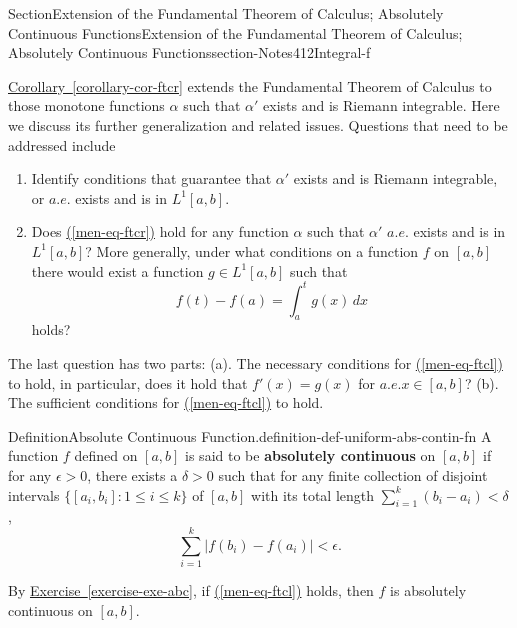 \documentclass[oneside,10pt,]{article}
\newcommand{\xreffont}{\relax}
\newcommand{\terminology}[1]{\textbf{#1}}
\numberwithin{equation}{section}
\begin{document}
\begin{sectionptx}{Section}{Extension of the Fundamental Theorem of Calculus; Absolutely Continuous Functions}{}{Extension of the Fundamental Theorem of Calculus; Absolutely Continuous Functions}{}{}{section-Notes412Integral-f}
\begin{introduction}{}%
\hyperref[corollary-cor-ftcr]{Corollary~{\xreffont\ref{corollary-cor-ftcr}}} extends the Fundamental Theorem of Calculus to those monotone functions \(\alpha\) such that \(\alpha'\) exists and is Riemann integrable. Here we discuss its further generalization and related issues. Questions that need to be addressed include %
\begin{enumerate}[label=(\Roman*).]
\item{}Identify conditions that guarantee that \(\alpha'\) exists and is Riemann integrable, or \(a.e.\) exists and is in \(L^{1}[a, b]\).%
\item{}Does \hyperref[men-eq-ftcr]{({\xreffont\ref{men-eq-ftcr}})} hold for any function \(\alpha\) such that \(\alpha'\)  \(a.e.\) exists and is in \(L^{1}[a, b]\)? More generally, under what conditions on a function \(f\) on \([a, b]\)  there would exist a function \(g\in L^{1}[a, b]\) such that%
\begin{equation}
f(t)-f(a) =\int_{a}^{t} g(x)\, dx\label{men-eq-ftcl}
\end{equation}
holds?%
\end{enumerate}
 The last question has two parts: (a). The necessary conditions for \hyperref[men-eq-ftcl]{({\xreffont\ref{men-eq-ftcl}})} to hold, in particular, does it hold that \(f'(x)=g(x)\) for \(a.e.\)\(x\in [a, b]\)? (b). The sufficient conditions for  \hyperref[men-eq-ftcl]{({\xreffont\ref{men-eq-ftcl}})} to hold.\end{introduction}%
\begin{definition}{Definition}{Absolute Continuous Function.}{definition-def-uniform-abs-contin-fn}%
A function \(f\) defined  on \([a, b]\) is said to be \terminology{absolutely continuous} on \([a, b]\) if for any \(\epsilon > 0\), there exists a \(\delta > 0\) such that for any finite collection	 of disjoint intervals \(\{[a_{i}, b_{i}]: 1\le i \le k\}\) of \([a, b]\) with its total length \(\sum_{i=1}^{k}(b_{i}-a_{i}) < \delta\),%
\begin{equation}
\sum_{i=1}^{k}|f(b_{i})-f(a_{i})| < \epsilon.\label{men-eq-abcfn}
\end{equation}
%
\end{definition}
By \hyperref[exercise-exe-abc]{Exercise~{\xreffont\ref{exercise-exe-abc}}}, if \hyperref[men-eq-ftcl]{({\xreffont\ref{men-eq-ftcl}})} holds, then \(f\) is absolutely continuous on \([a, b]\).%

\end{sectionptx}
\end{document}
